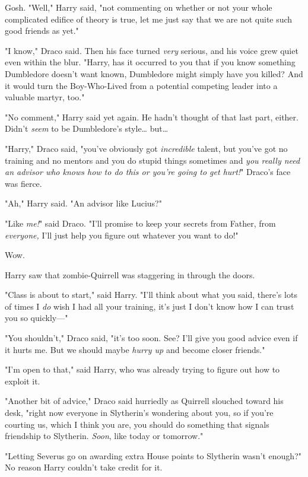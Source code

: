 Gosh. "Well," Harry said, "not commenting on whether or not your whole 
complicated edifice of theory is true, let me just say that we are not quite 
such good friends as yet."

"I know," Draco said. Then his face turned \emph{very} serious, and his voice 
grew quiet even within the blur. "Harry, has it occurred to you that if you 
know something Dumbledore doesn't want known, Dumbledore might simply have you 
killed? And it would turn the Boy-Who-Lived from a potential competing leader 
into a valuable martyr, too."

"No comment," Harry said yet again. He hadn't thought of that last part, 
either. Didn't \emph{seem} to be Dumbledore's style{\ldots} but{\ldots}

"Harry," Draco said, "you've obviously got \emph{incredible} talent, but you've 
got no training and no mentors and you do stupid things sometimes and \emph{you 
really need an advisor who knows how to do this or you're going to get hurt!}" 
Draco's face was fierce.

"Ah," Harry said. "An advisor like Lucius?"

"Like \emph{me!}" said Draco. "I'll promise to keep your secrets from Father, 
from \emph{everyone,} I'll just help you figure out whatever you want to do!"

Wow.

Harry saw that zombie-Quirrell was staggering in through the doors.

"Class is about to start," said Harry. "I'll think about what you said, there's 
lots of times I \emph{do} wish I had all your training, it's just I don't know 
how I can trust you so quickly---"

"You shouldn't," Draco said, "it's too soon. See? I'll give you good advice 
even if it hurts me. But we should maybe \emph{hurry up} and become closer 
friends."

"I'm open to that," said Harry, who was already trying to figure out how to 
exploit it.

"Another bit of advice," Draco said hurriedly as Quirrell slouched toward his 
desk, "right now everyone in Slytherin's wondering about you, so if you're 
courting us, which I think you are, you should do something that signals 
friendship to Slytherin. \emph{Soon}, like today or tomorrow."

"Letting Severus go on awarding extra House points to Slytherin wasn't enough?" 
No reason Harry couldn't take credit for it.


